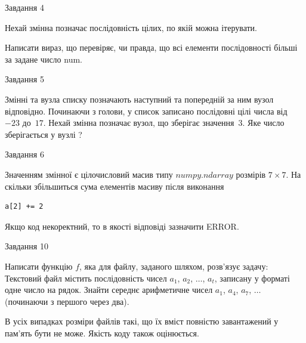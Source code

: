 \documentclass[12pt, ukrainian]{article}
\begin{document}
{\begin{minipage}[t]{8.0cm}
\end{minipage}


               
{\begin{center}Завдання {4}\end{center}}
\vspace{-4mm}
Нехай змінна  позначає послідовність цілих, по якій можна ітерувати.

Написати вираз, що перевіряє, чи правда, що всі елементи послідовності більші за задане число num.\par

\vspace{10mm}
               
{\begin{center}Завдання {5}\end{center}}
\vspace{-4mm}
Змінні  та  вузла списку позначають наступний та попередній за ним вузол відповідно. Починаючи з голови, у список записано послідовні цілі числа від~$-23$ до~$17$. Нехай змінна  позначає вузол, що зберігає значення~$3$.
Яке число зберігається у вузлі  ?\par

               
{\begin{center}Завдання {6}\end{center}}
\vspace{-4mm}
Значенням змінної  є цілочисловий масив типу $numpy.ndarray$ розмірів $7{\times}7$. На скільки збільшиться сума елементів масиву  після виконання
\begin{verbatim}
a[2] += 2
\end{verbatim}


Якщо код некоректний, то в якості відповіді зазначити ERROR.\par

               
{\begin{center}Завдання {10}\end{center}}
\vspace{-4mm}

Написати функцію $f$, яка для файлу, заданого шляхом, розв’язує задачу:\\ Текстовий файл містить послідовність чисел $a_1$, $a_2$, $\ldots$, $a_t$, записану у форматі одне число на рядок. Знайти середнє арифметичне чисел $a_1$, $a_4$, $a_7$, $\ldots$ (починаючи з першого через два).

В усіх випадках розміри файлів такі, що їх вміст повністю завантажений у пам'ять бути не може. Якість коду також оцінюється.



}
\end{document}
